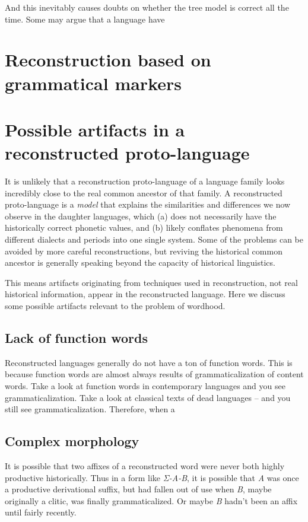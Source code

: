 \documentclass[a4paper, oneside, scheme=plain, 12pt]{article}
\newcommand{\form}[1]{\emph{#1}}
\begin{document}
And this inevitably causes doubts on whether the tree model is correct all the time.
Some may argue that a language have 

\section{Reconstruction based on grammatical markers}

\section{Possible artifacts in a reconstructed proto-language}

It is unlikely that a reconstruction proto-language of a language family
looks incredibly close to the real common ancestor of that family.
A reconstructed proto-language is a \emph{model} that explains
the similarities and differences we now observe in the daughter languages,
which (a) does not necessarily have the historically correct phonetic values,
and (b) likely conflates phenomena from different dialects and periods into one single system.
Some of the problems can be avoided by more careful reconstructions,
but reviving the historical common ancestor is generally speaking beyond the capacity of historical linguistics.

This means artifacts originating from techniques used in reconstruction,
not real historical information, appear in the reconstructed language.
Here we discuss some possible artifacts relevant to the problem of wordhood.

\subsection{Lack of function words}

Reconstructed languages generally do not have a ton of function words.
This is because function words are almost always results of grammaticalization of content words.
Take a look at function words in contemporary languages and you see grammaticalization.
Take a look at classical texts of dead languages -- and you still see grammaticalization.
Therefore, when a 

\subsection{Complex morphology}

It is possible that two affixes of a reconstructed word were never both highly productive historically.
Thus in a form like \form{Σ-A-B}, it is possible that \form{A} was once a productive derivational suffix,
but had fallen out of use when \form{B}, maybe originally a clitic, was finally grammaticalized.
Or maybe \form{B} hadn't been an affix until fairly recently.

\printbibliography
\end{document}
